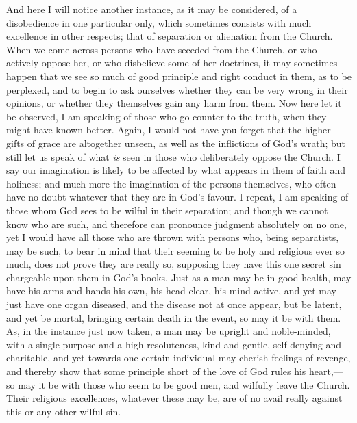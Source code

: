 And here I will notice another instance, as it may be considered,
of a disobedience in one particular only, which sometimes consists
with much excellence in other respects; that of separation or
alienation from the Church. When we come across persons who have
seceded from the Church, or who actively oppose her, or who disbelieve
some of her doctrines, it may sometimes happen that we see so much of
good principle and right conduct in them, as to be perplexed, and to
begin to ask ourselves whether they can be very wrong in their
opinions, or whether they themselves gain any harm from them. Now here
let it be observed, I am speaking of those who go counter to the
truth, when they might have known better. Again, I would not have you
forget that the higher gifts of grace are altogether unseen, as well
as the inflictions of God's wrath; but still let us speak of what \emph{is}
seen in those who deliberately oppose the Church. I say our
imagination is likely to be affected by what appears in them of faith
and holiness; and much more the imagination of the persons themselves,
who often have no doubt whatever that they are in God's favour. I
repeat, I am speaking of those whom God sees to be wilful in their
separation; and though we cannot know who are such, and therefore can
pronounce judgment absolutely on no one, yet I would have all those
who are thrown with persons who, being separatists, may be such, to
bear in mind that their seeming to be holy and religious ever so much,
does not prove they are really so, supposing they have this one secret
sin chargeable upon them in God's books. Just as a man may be in good
health, may have his arms and hands his own, his head clear, his mind
active, and yet may just have one organ diseased, and the disease not
at once appear, but be latent, and yet be mortal, bringing certain
death in the event, so may it be with them. As, in the instance just
now taken, a man may be upright and noble-minded, with a single
purpose and a high resoluteness, kind and gentle, self-denying and
charitable, and yet towards one certain individual may cherish
feelings of revenge, and thereby show that some principle short of the
love of God rules his heart,—so may it be with those who seem to be
good men, and wilfully leave the Church. Their religious excellences,
whatever these may be, are of no avail really against this or any
other wilful sin.

